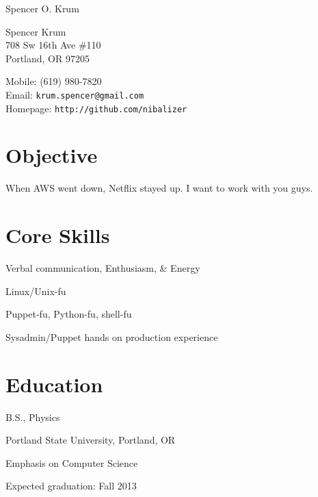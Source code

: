 \documentclass[10pt,letterpaper]{article}
\def\name{Spencer O. Krum}
\renewenvironment{itemize}{
  \begin{list}{}{
    \setlength{\leftmargin}{1.5em}
    \setlength{\itemsep}{0.25em}
    \setlength{\parskip}{0pt}
    \setlength{\parsep}{0.25em}
  }
}{
  \end{list}
}
\begin{document}
{\huge \name}


\vspace{0.25in}

\begin{minipage}[t]{0.5\textwidth}
  Spencer Krum\\
  708 Sw 16th Ave \#110\\
  Portland, OR 97205
\end{minipage}
\begin{minipage}[t]{0.5\textwidth}
  Mobile: (619) 980-7820 \\
  Email: \texttt{krum.spencer@gmail.com} \\
  Homepage: \texttt{http://github.com/nibalizer} \\
\end{minipage}

\section*{Objective}

When AWS went down, Netflix stayed up. I want to work with you guys.
\\

\begin{minipage}[t]{0.5\textwidth}
\section*{Core Skills}
\begin{itemize}
\item Verbal communication, Enthusiasm, \& Energy
\item Linux/Unix-fu
\item Puppet-fu, Python-fu, shell-fu
\item Sysadmin/Puppet hands on production experience
\end{itemize}
\end{minipage}
\begin{minipage}[t]{0.5\textwidth}
\section*{Education}
\begin{itemize}

  \item B.S., Physics
  \item Portland State University, Portland, OR
  \item Emphasis on Computer Science
  \item Expected graduation: Fall 2013
  
\end{itemize}
\end{minipage}
\end{document}
